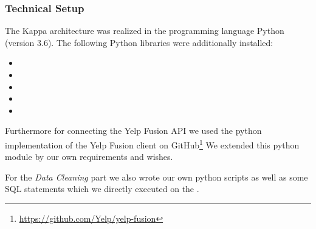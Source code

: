 \subsubsection{Technical Setup}
\label{subsubsec:setup}
The Kappa architecture was realized in the programming language Python (version 3.6).
The following Python libraries were additionally installed:

\begin{itemize}
  \item {}
  \item {}
  \item {}
  \item {}
  \item {}
\end{itemize}

Furthermore for connecting the Yelp Fusion \ac{API} we used the python implementation of the Yelp Fusion client on GitHub\footnote{\url{https://github.com/Yelp/yelp-fusion}}
We extended this python module by our own requirements and wishes.

For the \textit{Data Cleaning} part we also wrote our own python scripts as well as some \ac{SQL} statements which we directly executed on the \pg{}.
